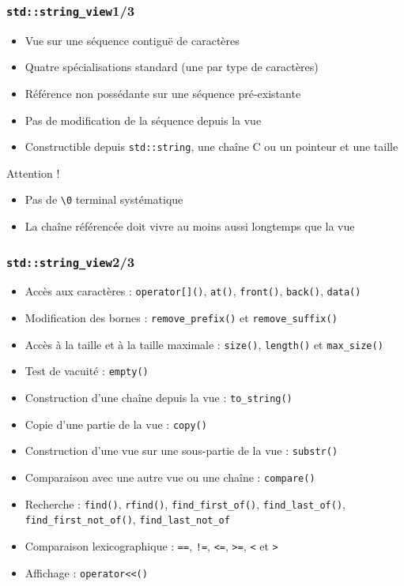 \documentclass[C++.tex]{subfiles}
\begin{document}
\begin{frame}[fragile]
	\frametitle{\lstinline|std::string_view|\titlehfill{}1/3}
	\begin{itemize}
		\item Vue sur une séquence contiguë de caractères
		\item Quatre spécialisations standard (une par type de caractères)


		\item Référence non possédante sur une séquence pré-existante
		\item Pas de modification de la séquence depuis la vue
		\item Constructible depuis \lstinline|std::string|, une chaîne C ou un pointeur et une taille
	\end{itemize}

	\begin{alertblock}{Attention !}
		\begin{itemize}
			\item Pas de \lstinline|\0| terminal systématique
			\item La chaîne référencée doit vivre au moins aussi longtemps que la vue
		\end{itemize}
	\end{alertblock}
\end{frame}

\begin{frame}[fragile]
	\frametitle{\lstinline|std::string_view|\titlehfill{}2/3}
	\begin{itemize}
		\item Accès aux caractères : \lstinline|operator[]()|, \lstinline|at()|, \lstinline|front()|, \lstinline|back()|, \lstinline|data()|
		\item Modification des bornes : \lstinline|remove_prefix()| et \lstinline|remove_suffix()|
		\item Accès à la taille et à la taille maximale : \lstinline|size()|, \lstinline|length()| et \lstinline|max_size()|
		\item Test de vacuité : \lstinline|empty()|
		\item Construction d'une chaîne depuis la vue : \lstinline|to_string()|
		\item Copie d'une partie de la vue : \lstinline|copy()|
		\item Construction d'une vue sur une sous-partie de la vue : \lstinline|substr()|
		\item Comparaison avec une autre vue ou une chaîne : \lstinline|compare()|
		\item Recherche : \lstinline|find()|, \lstinline|rfind()|, \lstinline|find_first_of()|, \lstinline|find_last_of()|, \lstinline|find_first_not_of()|, \lstinline|find_last_not_of|
		\item Comparaison lexicographique : \lstinline|==|, \lstinline|!=|, \lstinline|<=|, \lstinline|>=|, \lstinline|<| et \lstinline|>|
		\item Affichage : \lstinline|operator<<()|
	\end{itemize}
\end{frame}
\end{document}
